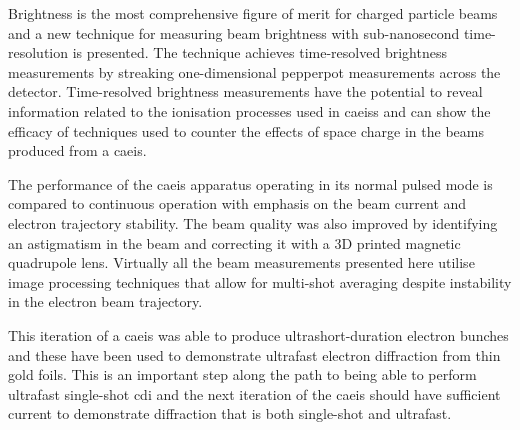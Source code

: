Brightness is the most comprehensive figure of merit for charged particle beams and a new technique for measuring beam brightness with sub-nanosecond time-resolution is presented.
The technique achieves time-resolved brightness measurements by streaking one-dimensional pepperpot measurements across the detector.
Time-resolved brightness measurements have the potential to reveal information related to the ionisation processes used in \glspl{caeis} and can show the efficacy of techniques used to counter the effects of space charge in the beams produced from a \gls{caeis}.

The performance of the \gls{caeis} apparatus operating in its normal pulsed mode is compared to continuous operation with emphasis on the beam current and electron trajectory stability.
The beam quality was also improved by identifying an astigmatism in the beam and correcting it with a 3D printed magnetic quadrupole lens.
Virtually all the beam measurements presented here utilise image processing techniques that allow for multi-shot averaging despite instability in the electron beam trajectory.

This iteration of a \gls{caeis} was able to produce ultrashort-duration electron bunches and these have been used to demonstrate ultrafast electron diffraction from thin gold foils.
This is an important step along the path to being able to perform ultrafast single-shot \gls{cdi} and the next iteration of the \gls{caeis} should have sufficient current to demonstrate diffraction that is both single-shot and ultrafast.